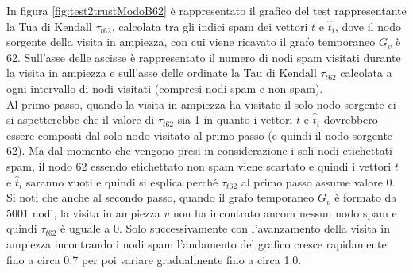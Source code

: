 In figura \ref{fig:test2trustModoB62} è rappresentato il grafico del test rappresentante la Tua di Kendall \(\tau_{t62}\), calcolata tra gli indici spam dei vettori \(t\) e \(\hat{t}_i\), dove il nodo sorgente della visita in ampiezza, con cui viene ricavato il grafo temporaneo \(G_v\) è 62. Sull'asse delle ascisse è rappresentato il numero di nodi spam visitati durante la visita in ampiezza e sull'asse delle ordinate la Tau di Kendall \(\tau_{t62}\) calcolata a ogni intervallo di nodi visitati (compresi nodi spam e non spam).\\
Al primo passo, quando la visita in ampiezza ha visitato il solo nodo sorgente ci si aspetterebbe che il valore di \(\tau_{t62}\) sia  1 in quanto i vettori \(t\) e \(\hat{t}_i\) dovrebbero essere composti dal solo nodo visitato al primo passo (e quindi il nodo sorgente 62).  Ma dal momento che vengono presi in considerazione i soli nodi etichettati spam, il nodo 62 essendo etichettato non spam  viene scartato e quindi i vettori \(t\) e \(\hat{t}_i\) saranno vuoti e quindi si esplica perché \(\tau_{t62}\) al primo passo assume valore 0. Si noti che anche al secondo passo, quando il grafo temporaneo \(G_v\) è formato da 5001 nodi, la visita in ampiezza \(v\) non ha incontrato ancora nessun nodo spam e quindi \(\tau_{t62}\) è uguale a 0. Solo successivamente con l'avanzamento della visita in ampiezza  incontrando i nodi spam l'andamento del grafico cresce rapidamente fino a circa 0.7 per poi variare gradualmente fino a circa 1.0. 

